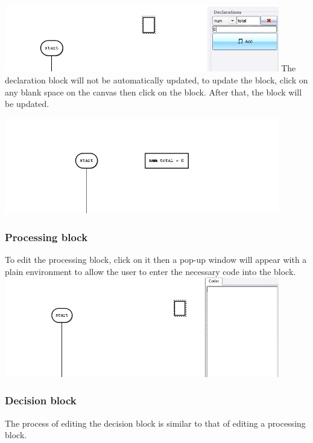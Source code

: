 \documentclass[11pt,a4paper,titlepage]{article}
\begin{document}
	\includegraphics[width=12cm]{images/editDeclaration2.jpg} \newline \newline
	The declaration block will not be automatically updated, to update the block, click on any blank space on the canvas then click on the block. After that, the block will be updated.
	
	\includegraphics[width=12cm]{images/editDeclaration3.jpg}
	
	
	\subsubsection{Processing block}
	
	To edit the processing block, click on it then a pop-up window will appear with a plain environment to allow the user to enter the necessary code into the block.\\ \newline
	\includegraphics[width=12cm]{images/editProcessing.jpg} \newline
	
	\subsubsection{Decision block}
	
	The process of editing the decision block is similar to that of editing a processing block. \newline
	
\end{document}
